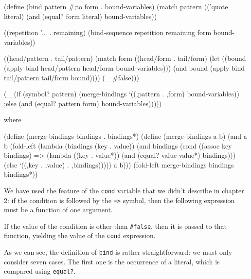 \begin{Snippet}
  (define (bind pattern #;to form . bound-variables)
    (match pattern
      (('quote literal)
       (and (equal? form literal)
            bound-variables))
\end{Snippet}
\begin{Snippet}
      ((repetition '... . remaining)
       (bind-sequence repetition remaining form
                      bound-variables))
\end{Snippet}
\begin{Snippet}
      ((head/pattern . tail/pattern)
       (match form
         ((head/form . tail/form)
          (let ((bound (apply bind head/pattern head/form
                              bound-variables)))
            (and bound
                 (apply bind tail/pattern tail/form bound))))
         (_
          #false)))
\end{Snippet}  
\begin{Snippet}
      (_
       (if (symbol? pattern)
         (merge-bindings `((,pattern . ,form) bound-variables))
       ;else
         (and (equal? pattern form)
              bound-variables)))))
\end{Snippet}  
where
\begin{Snippet}
  (define (merge-bindings bindings . bindings*)
    (define (merge-bindings a b)
      (and a b
           (fold-left (lambda (bindings (key . value))
                        (and bindings
                             (cond ((assoc key bindings)
                                    => (lambda ((key . value*))
                                         (and (equal? value value*)
                                              bindings)))
                                   (else
                                    `((,key . ,value)
                                      . ,bindings)))))
                      a
                      b)))
    (fold-left merge-bindings bindings bindings*))
\end{Snippet}

We have used the feature of the \texttt{cond} variable that we didn't
describe in chapter 2: if the condition is followed by the \texttt{=>}
symbol, then the following expression must be a function of one argument.

If the value of the condition is other than \texttt{\#false}, then it
is passed to that function, yielding the value of the \texttt{cond}
expression.

As we can see, the definition of \texttt{bind} is rather
straightforward: we must only consider seven cases. The first one is the
occurrence of a literal, which is compared using \texttt{equal?}.

